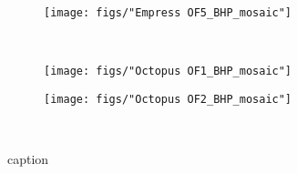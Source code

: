 \newpage

\begin{figure}[h]\ContinuedFloat
    \begin{subfigure}[b]{\linewidth}
    	\texttt{[image: figs/"Empress OF5\_BHP\_mosaic"]}
        \label{fig:EP5_degform}
    \end{subfigure}\\[-4ex]
    \begin{subfigure}[b]{\linewidth}
        \texttt{[image: figs/"Octopus OF1\_BHP\_mosaic"]}
        \label{fig:OS1_degform}
    \end{subfigure}
\end{figure}

\newpage

\begin{figure}[h]\ContinuedFloat
    \begin{subfigure}[b]{\linewidth}
        \texttt{[image: figs/"Octopus OF2\_BHP\_mosaic"]}
        \label{fig:OS2_degform}
    \end{subfigure}\\[-4ex]

\caption{caption}
\label{fig:degree_formation}
\end{figure}
